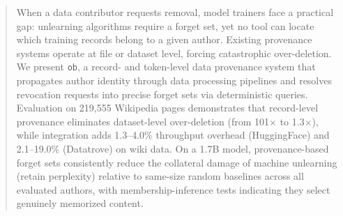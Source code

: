 \begin{abstract}
	When a data contributor requests removal, model trainers face a practical gap: unlearning algorithms require a forget set, yet no tool can locate which training records belong to a given author. Existing provenance systems operate at file or dataset level, forcing catastrophic over-deletion. We present \texttt{ob}, a record- and token-level data provenance system that propagates author identity through data processing pipelines and resolves revocation requests into precise forget sets via deterministic queries. Evaluation on 219,555 Wikipedia pages demonstrates that record-level provenance eliminates dataset-level over-deletion (from 101$\times$ to 1.3$\times$), while integration adds 1.3--4.0\% throughput overhead (HuggingFace) and 2.1--19.0\% (Datatrove) on wiki data. On a 1.7B model, provenance-based forget sets consistently reduce the collateral damage of machine unlearning (retain perplexity) relative to same-size random baselines across all evaluated authors, with membership-inference tests indicating they select genuinely memorized content.
\end{abstract}

